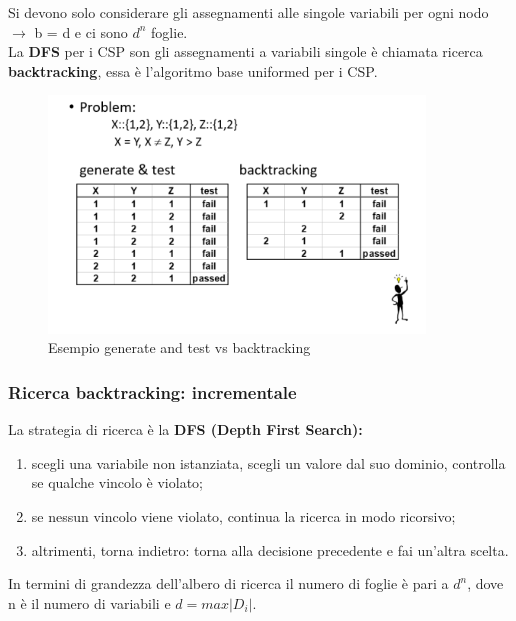 Si devono solo considerare gli assegnamenti alle singole variabili per ogni nodo
$\rightarrow$ b = d e ci sono $d^n$ foglie. \\La \textbf{DFS} per i CSP son gli
assegnamenti a variabili singole è chiamata ricerca \textbf{backtracking}, essa
è l'algoritmo base uniformed per i CSP.
\begin{figure}[htp]
    \centering
    \includegraphics[width=10cm, keepaspectratio]{img/Cap2/back2.png}
    \caption{Esempio generate and test vs backtracking}
\end{figure}

\subsubsection{Ricerca backtracking: incrementale}
La strategia di ricerca è la \textbf{DFS (Depth First Search):}
\begin{enumerate}
    \item scegli una variabile non istanziata, scegli un valore dal suo dominio,
          controlla se qualche vincolo è violato;
    \item se nessun vincolo viene violato, continua la ricerca in modo
          ricorsivo;
    \item altrimenti, torna indietro: torna alla decisione precedente e fai
          un'altra scelta.
\end{enumerate}
In termini di grandezza dell'albero di ricerca il numero di foglie è pari a
$d^n$, dove n è il numero di variabili e $d = max|D_i|$.

